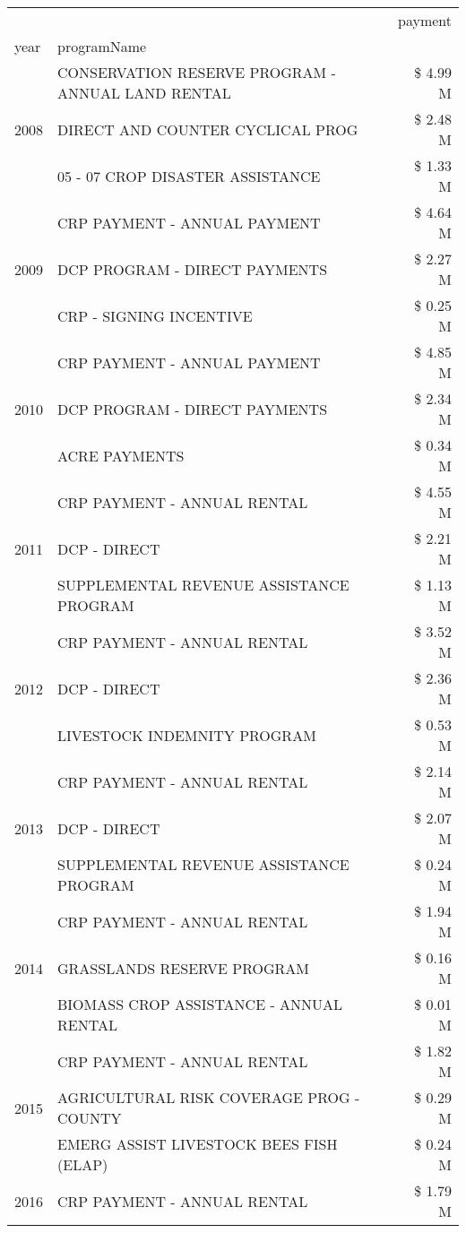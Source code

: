 \begin{tabular}{llr}
\toprule
 &  & payment \\
year & programName &  \\
\midrule
\multirow[t]{3}{*}{2008} & CONSERVATION RESERVE PROGRAM - ANNUAL LAND RENTAL & \$ 4.99 M \\
 & DIRECT AND COUNTER CYCLICAL PROG & \$ 2.48 M \\
 & 05 - 07 CROP DISASTER ASSISTANCE & \$ 1.33 M \\
\cline{1-3}
\multirow[t]{3}{*}{2009} & CRP PAYMENT - ANNUAL PAYMENT & \$ 4.64 M \\
 & DCP PROGRAM - DIRECT PAYMENTS & \$ 2.27 M \\
 & CRP - SIGNING INCENTIVE & \$ 0.25 M \\
\cline{1-3}
\multirow[t]{3}{*}{2010} & CRP PAYMENT - ANNUAL PAYMENT & \$ 4.85 M \\
 & DCP PROGRAM - DIRECT PAYMENTS & \$ 2.34 M \\
 & ACRE PAYMENTS & \$ 0.34 M \\
\cline{1-3}
\multirow[t]{3}{*}{2011} & CRP PAYMENT - ANNUAL RENTAL & \$ 4.55 M \\
 & DCP - DIRECT & \$ 2.21 M \\
 & SUPPLEMENTAL REVENUE ASSISTANCE PROGRAM & \$ 1.13 M \\
\cline{1-3}
\multirow[t]{3}{*}{2012} & CRP PAYMENT - ANNUAL RENTAL & \$ 3.52 M \\
 & DCP - DIRECT & \$ 2.36 M \\
 & LIVESTOCK INDEMNITY PROGRAM & \$ 0.53 M \\
\cline{1-3}
\multirow[t]{3}{*}{2013} & CRP PAYMENT - ANNUAL RENTAL & \$ 2.14 M \\
 & DCP - DIRECT & \$ 2.07 M \\
 & SUPPLEMENTAL REVENUE ASSISTANCE PROGRAM & \$ 0.24 M \\
\cline{1-3}
\multirow[t]{3}{*}{2014} & CRP PAYMENT - ANNUAL RENTAL & \$ 1.94 M \\
 & GRASSLANDS RESERVE PROGRAM & \$ 0.16 M \\
 & BIOMASS CROP ASSISTANCE - ANNUAL RENTAL & \$ 0.01 M \\
\cline{1-3}
\multirow[t]{3}{*}{2015} & CRP PAYMENT - ANNUAL RENTAL & \$ 1.82 M \\
 & AGRICULTURAL RISK COVERAGE PROG - COUNTY & \$ 0.29 M \\
 & EMERG ASSIST LIVESTOCK BEES FISH (ELAP) & \$ 0.24 M \\
\cline{1-3}
\multirow[t]{3}{*}{2016} & CRP PAYMENT - ANNUAL RENTAL & \$ 1.79 M \\

\end{tabular}
